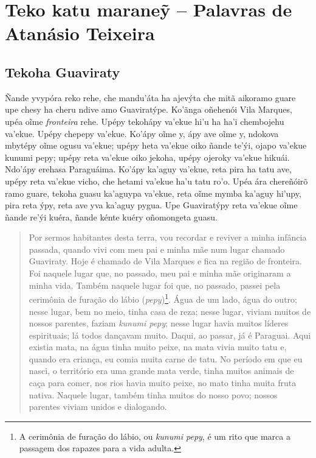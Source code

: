 \part{Teko katu maraneỹ -- Palavras de Atanásio Teixeira}

\chapter{Tekoha Guaviraty}

Ñande yvypóra reko rehe, che mandu'áta ha ajevýta che mitã aikoramo
guare upe chesy ha cheru ndive amo Guaviratýpe. Ko'ãnga oñehenói Vila
Marques, upéa oĩme \emph{fronteira} rehe. Upépy tekohápy va'ekue hi'u ha
ha'i chembojehu va'ekue. Upépy chepepy va'ekue. Ko'ápy oĩme y, ápy ave
oĩme y, ndokova mbytépy oĩme ogusu va'ekue; upépy heta va'ekue oiko
ñande te'ýi, ojapo va'ekue kunumi pepy; upépy reta va'ekue oiko jekoha,
upépy ojeroky va'ekue hikuái. Ndo'ápy erehasa Paraguáima. Ko'ápy ka'aguy
va'ekue, reta pira ha tatu ave, upépy reta va'ekue vicho, che hetami
va'ekue ha'u tatu ro'o. Upéa ára chereñóirõ ramo guare, tekoha guasu
ka'aguypa va'ekue, reta oĩme mymba ka'aguy hi'upy, pira reta ýpy, reta
ave yva ka'aguy pygua. Upe Guaviratýpy reta va'ekue oĩme ñande re'ýi
kuéra, ñande kénte kuéry oñomongeta guasu.

\begin{quote}
Por sermos habitantes desta terra, vou recordar e reviver a minha
infância passada, quando vivi com meu pai e minha mãe num lugar chamado
Guaviraty. Hoje é chamado de Vila Marques e fica na região de fronteira.
Foi naquele lugar que, no passado, meu pai e minha mãe originaram a
minha vida. Também naquele lugar foi que, no passado, passei pela
cerimônia de furação do lábio (\emph{pepy})\footnote{A cerimônia de
  furação do lábio, ou \emph{kunumi pepy}, é um rito que marca a
  passagem dos rapazes para a vida adulta.}. Água de um lado, água do
outro; nesse lugar, bem no meio, tinha casa de reza; nesse lugar, viviam
muitos de nossos parentes, faziam \emph{kunumi pepy}; nesse lugar havia
muitos líderes espirituais; lá todos dançavam muito. Daqui, ao passar,
já é Paraguai. Aqui existia mata, na água tinha muito peixe, na mata
vivia muito tatu e, quando era criança, eu comia muita carne de tatu. No
período em que eu nasci, o território era uma grande mata verde, tinha
muitos animais de caça para comer, nos rios havia muito peixe, no mato
tinha muita fruta nativa. Naquele lugar, também tinha muitos do nosso
povo; nossos parentes viviam unidos e dialogando.
\end{quote}

